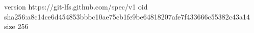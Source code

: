 version https://git-lfs.github.com/spec/v1
oid sha256:a8c14ce6d454853bbbc10ae75cb1fe9be64818207afe7f433666c55382c43a14
size 256
